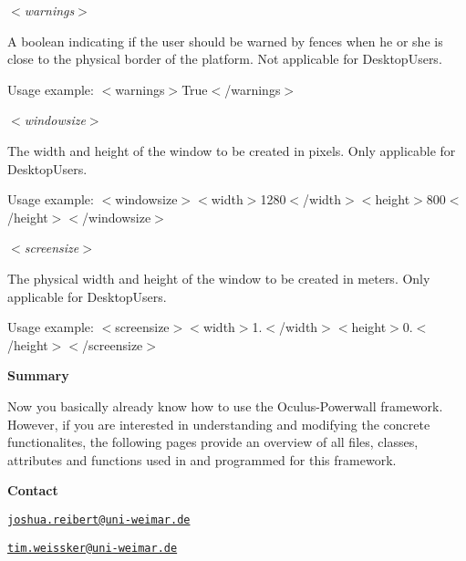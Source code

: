 {\itshape $<$warnings$>$\/}\par
 \-A boolean indicating if the user should be warned by fences when he or she is close to the physical border of the platform. \-Not applicable for \-Desktop\-Users. \par
 \-Usage example\-: {\ttfamily $<$warnings$>$\-True$<$/warnings$>$}

{\itshape $<$windowsize$>$\/}\par
 \-The width and height of the window to be created in pixels. \-Only applicable for \-Desktop\-Users.\par
 \-Usage example\-: {\ttfamily $<$windowsize$>$$<$width$>$1280$<$/width$>$$<$height$>$800$<$/height$>$$<$/windowsize$>$}

{\itshape $<$screensize$>$\/}\par
 \-The physical width and height of the window to be created in meters. \-Only applicable for \-Desktop\-Users.\par
 \-Usage example\-: {\ttfamily $<$screensize$>$$<$width$>$1.$<$/width$>$$<$height$>$0.$<$/height$>$$<$/screensize$>$}

\par
 {\bfseries \-Summary}\par
 \-Now you basically already know how to use the \-Oculus-\/\-Powerwall framework. \-However, if you are interested in understanding and modifying the concrete functionalites, the following pages provide an overview of all files, classes, attributes and functions used in and programmed for this framework.

\par
 {\bfseries \-Contact}\par
 \href{mailto:joshua.reibert@uni-weimar.de}{\tt joshua.\-reibert@uni-\/weimar.\-de}\par
 \href{mailto:tim.weissker@uni-weimar.de}{\tt tim.\-weissker@uni-\/weimar.\-de} 